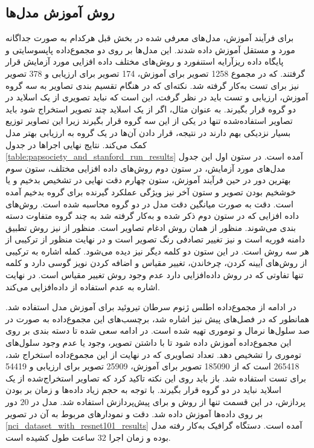 \subsection{روش آموزش مدل‌ها}\label{subsec:روش آموزش مدل‌ها}
برای فرآیند آموزش، مدل‌های معرفی شده در بخش قبل هرکدام به صورت جداگانه مورد و مستقل آموزش داده شدند. این مدل‌ها بر روی دو مجموع‌داده پاپسوسایتی و پایگاه داده ریزآرایه استنفورد و روش‌های مختلف داده افزایی مورد آزمایش قرار گرفتند. که در مجموع 1258 تصویر برای آموزش، 174 تصویر برای ارزیابی و 378 تصویر نیز برای تست به‌کار گرفته شد. نکته‌ای که در هنگام تقسیم بندی تصاویر به سه گروه آموزش، ارزیابی و تست باید در نظر گرفت، این است که نباید تصویری از یک اسلاید در دو گروه قرار بگیرند. به عنوان مثال، اگر از یک اسلاید چند تصویر استخراج شود باید تصاویر استفاده‌شده تنها در یکی از این سه گروه قرار بگیرند زیرا این تصاویر توزیع بسیار نزدیکی بهم دارند در نتیجه، قرار دادن آن‌ها در یک گروه به ارزیابی بهتر مدل کمک می‌کند.
نتایج نهایی اجراها در جدول \ref{table:papsociety_and_stanford_run_results} آمده است.
در ستون اول این جدول مدل‌های مورد آزمایش، در ستون دوم روش‌های داده افزایی مختلف، ستون سوم بهترین دور در حین فرآیند آموزش، ستون چهارم دقت نهایی در تشخیص بدخیم و یا خوشخیم بودن تصویر و ستون آخر نیز ویژگی عملکرد گیرنده برای گروه بدخیم آمده است. دقت به صورت میانگین دقت مدل در دو گروه محاسبه شده است.
روش‌های داده افزایی که در ستون دوم ذکر شده و به‌کار گرفته شد به چند گروه متفاوت دسته بندی می‌شوند. منظور از  همان روش ادغام تصاویر است. منظور از  نیز روش تطبیق دامنه فوریه است و  نیز تغییر تصادفی رنگ تصویر است و در نهایت منظور از  ترکیبی از هر سه روش است. در این ستون دو کلمه دیگر نیز دیده می‌شود. کمله  اشاره به ترکیبی از روش‌های آیینه کردن، چرخاندن، تغییر مقیاس و اضافه کردن نویز گوسی دارد و کلمه  تنها تفاوتی که در روش داده‌افزایی دارد عدم وجود روش تغییر مقیاس است. در نهایت  اشاره به عدم استفاده از داده‌افزایی می‌کند.

در ادامه از مجموع‌داده اطلس ژنوم سرطان تیروئید برای آموزش مدل  استفاده شد. همانطور که در فصل‌های پیش نیز اشاره شد، برچسب‌های این مجموع‌داده به صورت در صد سلول‌ها نرمال و توموری تهیه شده است. در ادامه سعی شده تا دسته بندی بر روی این مجموع‌داده آموزش داده شود تا با داشتن تصویر، وجود یا عدم وجود سلول‌های توموری را تشخیص دهد. تعداد تصاویری که در نهایت از این مجموع‌داده استخراج شد، 265418 است که از 185090 تصویر برای آموزش، 25909 تصویر برای ارزیابی و 54419 برای تست استفاده شد. باز باید روی این نکته تاکید کرد که تصاویر استخراج‌شده از یک اسلاید نباید در دو گروه قرار بگیرند.
با توجه به حجم زیاد داده‌ها و زمان بر بودن پردازش، در این قسمت تنها از روش  و  برای پیش‌پردازش استفاده شد. مدل در $20$ دور بر روی داده‌ها آموزش داده شد. دقت و نمودار‌های مربوط به آن در تصویر \ref{nci_dataset_with_resnet101_results} آمده است. دستگاه گرافیک به‌کار رفته مدل  بوده و زمان اجرا $32$ ساعت طول کشیده است.





